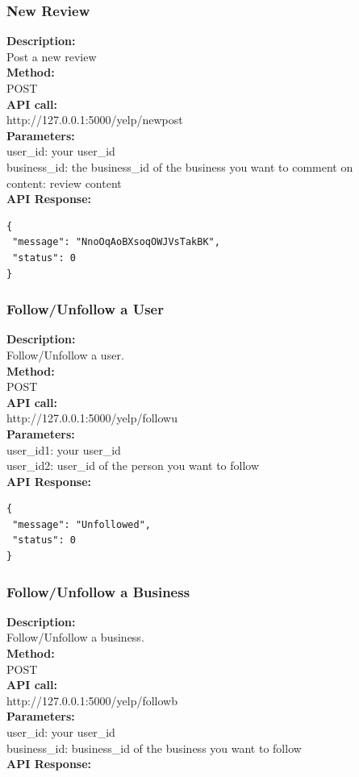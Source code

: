 \documentclass[12pt]{article}
\begin{document}
\subsubsection{New Review}
\textbf{Description:}\\
Post a new review\\
\textbf{Method:}\\
POST\\
\textbf{API call:}\\
http://127.0.0.1:5000/yelp/newpost\\
\textbf{Parameters:}\\
user\_id: your user\_id\\
business\_id: the business\_id of the business you want to comment on\\
content: review content\\
\textbf{API Response:}

\begin{singlespacing}
\begin{lstlisting}
{
 "message": "NnoOqAoBXsoqOWJVsTakBK",
 "status": 0
}
\end{lstlisting}
\end{singlespacing}

\subsubsection{Follow/Unfollow a User}
\textbf{Description:}\\
Follow/Unfollow a user.\\
\textbf{Method:}\\
POST\\
\textbf{API call:}\\
http://127.0.0.1:5000/yelp/followu\\
\textbf{Parameters:}\\
user\_id1: your user\_id\\
user\_id2: user\_id of the person you want to follow\\
\textbf{API Response:}

\begin{singlespacing}
\begin{lstlisting}
{
 "message": "Unfollowed",
 "status": 0
}
\end{lstlisting}
\end{singlespacing}

\subsubsection{Follow/Unfollow a Business}
\textbf{Description:}\\
Follow/Unfollow a business.\\
\textbf{Method:}\\
POST\\
\textbf{API call:}\\
http://127.0.0.1:5000/yelp/followb\\
\textbf{Parameters:}\\
user\_id: your user\_id\\
business\_id: business\_id of the business you want to follow\\
\textbf{API Response:}
\end{document}
